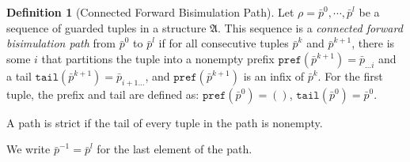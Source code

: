 \documentclass[draft]{scrartcl}
\theoremstyle{definition}
\newtheorem{definition}[theorem]{Definition}
\begin{document}
\begin{definition}[Connected Forward Bisimulation Path]\label{def:bisim-path}
  Let $\rho = \bar{p}^{0}, \cdots, \bar{p}^{l}$ be a sequence of guarded tuples in a structure $\mathfrak{A}$.
  This sequence is a \emph{connected forward bisimulation path} from $\bar{p}^{0}$ to $\bar{p}^{l}$ if for all consecutive tuples $\bar{p}^{k}$ and $\bar{p}^{k+1}$,
  there is some $i$ that partitions the tuple into a nonempty prefix $\mathtt{pref}(\bar{p}^{k+1}) = \bar{p}_{\ldots{}i}$ and a tail $\mathtt{tail}(\bar{p}^{k+1}) = \bar{p}_{i+1\ldots{}}$,
  and $\mathtt{pref}(\bar{p}^{k+1})$ is an infix of $\bar{p}^{k}$. For the first tuple, the prefix and tail are defined as: $\mathtt{pref}(\bar{p}^{0}) = ()$, $\mathtt{tail}(\bar{p}^{0}) = \bar{p}^{0}$.

  A path is strict if the tail of every tuple in the path is nonempty.

  We write $\bar{p}^{-1} = \bar{p}^{l}$ for the last element of the path.
\end{definition}
\end{document}

